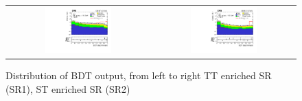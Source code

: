 \begin{figure}[tbh!]
 \begin{center}
 \begin{tabular}{cc}
  \includegraphics[width=0.48\textwidth]{figures/Part3/BDT/BDT_TT}&
  \includegraphics[width=0.48\textwidth]{figures/Part3/BDT/BDT_ST}\\
 \end{tabular}
 \caption{Distribution of BDT output, from left to right TT enriched SR (SR1), ST enriched SR (SR2)}
 \label{fig:bdt_output}
 \end{center}
\end{figure}